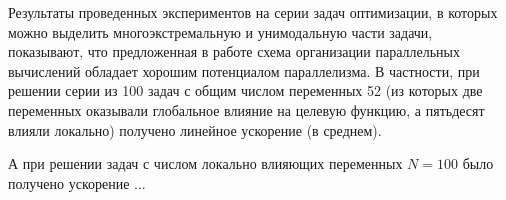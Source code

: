 \documentclass{svproc}
\begin{document}
Результаты проведенных экспериментов на серии задач оптимизации, в которых можно выделить многоэкстремальную и унимодальную части задачи, показывают, что предложенная в работе схема организации параллельных вычислений обладает хорошим потенциалом параллелизма. 
В частности, при решении серии из 100 задач с общим числом переменных 52 (из которых две переменных оказывали глобальное влияние на целевую функцию, а пятьдесят влияли локально) получено линейное ускорение (в среднем). 

А при решении задач с числом локально влияющих переменных $N=100$ было получено ускорение ...




%
%

{}
\end{document}
